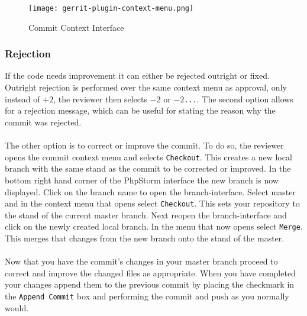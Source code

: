\begin{figure}[h] 
	\centering
	\texttt{[image: gerrit-plugin-context-menu.png]}
	\caption{Commit Context Interface}
	\label{fig:gerrit-plugin-context-menu}
\end{figure}

\subsubsection{Rejection}

If the code needs improvement it can either be rejected outright or fixed. Outright rejection is performed over the same context menu as approval, only instead of \texttt{$+2$}, the reviewer then selects \texttt{$-2$} or \texttt{$-2$...}. The second option allows for a rejection message, which can be useful for stating the reason why the commit was rejected.\\
\\
The other option is to correct or improve the commit. To do so, the reviewer opens the commit context menu and selects \texttt{Checkout}. This creates a new local branch with the same stand as the commit to be corrected or improved. In the bottom right hand corner of the PhpStorm interface the new branch is now displayed. Click on the branch name to open the branch-interface. Select master and in the context menu that opens select \texttt{Checkout}. This sets your repository to the stand of the current master branch. Next reopen the branch-interface and click on the newly created local branch. In the menu that now opens select \texttt{Merge}. This merges that changes from the new branch onto the stand of the master.\\
\\
Now that you have the commit's changes in your master branch proceed to correct and improve the changed files as appropriate. When you have completed your changes append them to the previous commit by placing the checkmark in the \texttt{Append Commit} box and performing the commit and push as you normally would.

\newpage
